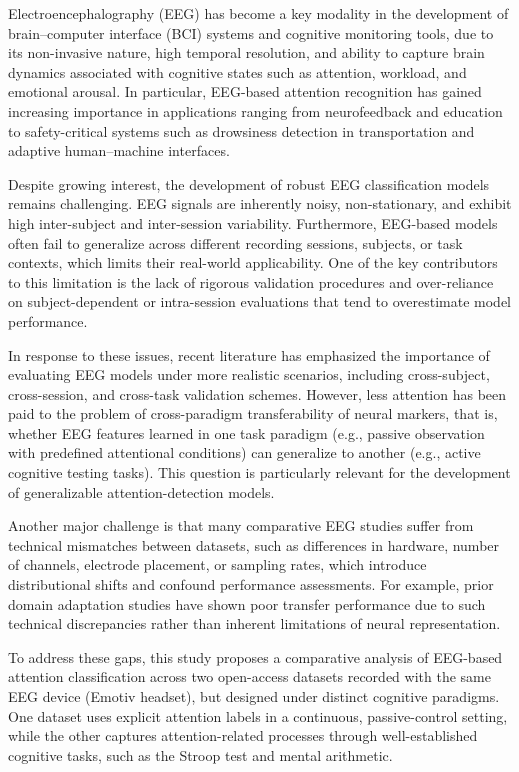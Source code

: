 \documentclass[10pt,letterpaper]{article}
\begin{document}
Electroencephalography (EEG) has become a key modality in the development of brain--computer interface (BCI) systems and cognitive monitoring tools, due to its non-invasive nature, high temporal resolution, and ability to capture brain dynamics associated with cognitive states such as attention, workload, and emotional arousal. In particular, EEG-based attention recognition has gained increasing importance in applications ranging from neurofeedback and education to safety-critical systems such as drowsiness detection in transportation and adaptive human--machine interfaces.

Despite growing interest, the development of robust EEG classification models remains challenging. EEG signals are inherently noisy, non-stationary, and exhibit high inter-subject and inter-session variability. Furthermore, EEG-based models often fail to generalize across different recording sessions, subjects, or task contexts, which limits their real-world applicability. One of the key contributors to this limitation is the lack of rigorous validation procedures and over-reliance on subject-dependent or intra-session evaluations that tend to overestimate model performance.

In response to these issues, recent literature has emphasized the importance of evaluating EEG models under more realistic scenarios, including cross-subject, cross-session, and cross-task validation schemes. However, less attention has been paid to the problem of cross-paradigm transferability of neural markers, that is, whether EEG features learned in one task paradigm (e.g., passive observation with predefined attentional conditions) can generalize to another (e.g., active cognitive testing tasks). This question is particularly relevant for the development of generalizable attention-detection models.

Another major challenge is that many comparative EEG studies suffer from technical mismatches between datasets, such as differences in hardware, number of channels, electrode placement, or sampling rates, which introduce distributional shifts and confound performance assessments. For example, prior domain adaptation studies have shown poor transfer performance due to such technical discrepancies rather than inherent limitations of neural representation.

To address these gaps, this study proposes a comparative analysis of EEG-based attention classification across two open-access datasets recorded with the same EEG device (Emotiv headset), but designed under distinct cognitive paradigms. One dataset uses explicit attention labels in a continuous, passive-control setting, while the other captures attention-related processes through well-established cognitive tasks, such as the Stroop test and mental arithmetic.
\end{document}
